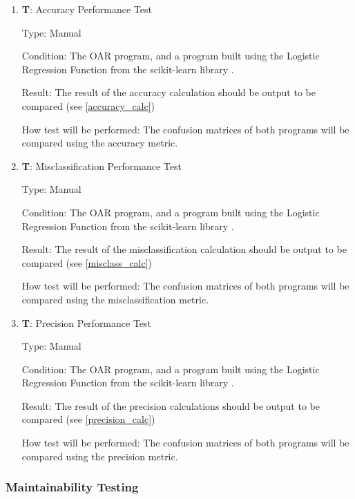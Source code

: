 \documentclass[12pt, titlepage]{article}
\newcounter{testnum} %
\begin{document}
\begin{enumerate}

  \item{\textbf{T\thetestnum \label{T_accuracy}}: Accuracy Performance Test\\}

  Type: Manual
            
  Condition: The OAR program, and a program built
  using the Logistic Regression Function from the scikit-learn library \citep{SKLearn}.
            
  Result: The result of the accuracy calculation should be output to be compared (see \ref{accuracy_calc})
            
  How test will be performed: The confusion matrices of both programs will be compared using the accuracy metric.

  \item{\textbf{T\thetestnum \label{T_misclass}}: Misclassification Performance Test\\}

  Type: Manual
            
  Condition: The OAR program, and a program built
  using the Logistic Regression Function from the scikit-learn library \citep{SKLearn}.
            
  Result: The result of the misclassification calculation should be output to be compared (see \ref{misclass_calc})
            
  How test will be performed: The confusion matrices of both programs will be compared using the misclassification metric.

  \item{\textbf{T\thetestnum \label{T_precision}}: Precision Performance Test\\}

  Type: Manual
            
  Condition: The OAR program, and a program built
  using the Logistic Regression Function from the scikit-learn library \citep{SKLearn}.
            
  Result: The result of the precision calculations should be output to be compared (see \ref{precision_calc})
            
  How test will be performed: The confusion matrices of both programs will be compared using the precision metric.
\end{enumerate} 
					

\subsubsection{Maintainability Testing}
\end{document}
